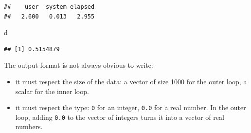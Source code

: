 \documentclass[
  12pt,
  american,
  a4paper,
  extrafontsizes,onecolumn,openright
  ]{memoir}
\newenvironment{Shaded}{\begin{snugshade}}{\end{snugshade}}
\newcommand{\ControlFlowTok}[1]{\textcolor[rgb]{0.13,0.29,0.53}{\textbf{#1}}}
\newcommand{\DecValTok}[1]{\textcolor[rgb]{0.00,0.00,0.81}{#1}}
\newcommand{\FunctionTok}[1]{\textcolor[rgb]{0.13,0.29,0.53}{\textbf{#1}}}
\newcommand{\NormalTok}[1]{#1}
\newcommand{\OtherTok}[1]{\textcolor[rgb]{0.56,0.35,0.01}{#1}}
\newcommand{\SpecialCharTok}[1]{\textcolor[rgb]{0.81,0.36,0.00}{\textbf{#1}}}
\providecommand{\tightlist}{%
  \setlength{\itemsep}{0pt}\setlength{\parskip}{0pt}}
\begin{document}
\begin{Shaded}
\end{Shaded}

\begin{verbatim}
##    user  system elapsed 
##   2.600   0.013   2.955
\end{verbatim}

\begin{Shaded}
\begin{Highlighting}[]
\NormalTok{d}
\end{Highlighting}
\end{Shaded}

\begin{verbatim}
## [1] 0.5154879
\end{verbatim}

\normalsize

The output format is not always obvious to write:

\begin{itemize}
\tightlist
\item
  it must respect the size of the data: a vector of size 1000 for the outer loop, a scalar for the inner loop.
\item
  it must respect the type: \texttt{0} for an integer, \texttt{0.0} for a real number. In the outer loop, adding \texttt{0.0} to the vector of integers turns it into a vector of real numbers.
\end{itemize}
\end{document}
